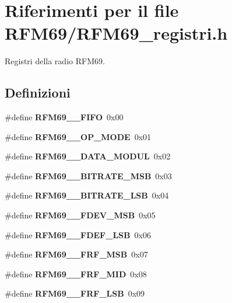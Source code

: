 \section{Riferimenti per il file R\+F\+M69/\+R\+F\+M69\+\_\+registri.h}
\label{_r_f_m69__registri_8h}


Registri della radio R\+F\+M69.  


\subsection*{Definizioni}
\begin{DoxyCompactItemize}
\item 
\mbox{\label{_r_f_m69__registri_8h_a0d65a2190c0877f705ef6b3f6bb2d181}} 
\#define {\bfseries R\+F\+M69\+\_\+\_\+\+F\+I\+FO}~0x00
\item 
\mbox{\label{_r_f_m69__registri_8h_a7026c0eeb6c9ff4a3c836b9c2510e92d}} 
\#define {\bfseries R\+F\+M69\+\_\+\_\+\+O\+P\+\_\+\+M\+O\+DE}~0x01
\item 
\mbox{\label{_r_f_m69__registri_8h_ac3e0614cefd0de36fab33cf18fd6178a}} 
\#define {\bfseries R\+F\+M69\+\_\+\_\+\+D\+A\+T\+A\+\_\+\+M\+O\+D\+UL}~0x02
\item 
\mbox{\label{_r_f_m69__registri_8h_aee33de14b2c7923a72fa3fb94675d502}} 
\#define {\bfseries R\+F\+M69\+\_\+\_\+\+B\+I\+T\+R\+A\+T\+E\+\_\+\+M\+SB}~0x03
\item 
\mbox{\label{_r_f_m69__registri_8h_a9a6fb1af1b6dbb92986013cd5fc61667}} 
\#define {\bfseries R\+F\+M69\+\_\+\_\+\+B\+I\+T\+R\+A\+T\+E\+\_\+\+L\+SB}~0x04
\item 
\mbox{\label{_r_f_m69__registri_8h_ad77df18feac22de48ea0d31db04b5f51}} 
\#define {\bfseries R\+F\+M69\+\_\+\_\+\+F\+D\+E\+V\+\_\+\+M\+SB}~0x05
\item 
\mbox{\label{_r_f_m69__registri_8h_a3fb6b789781742b9d2e2c54f52cf39a3}} 
\#define {\bfseries R\+F\+M69\+\_\+\_\+\+F\+D\+E\+F\+\_\+\+L\+SB}~0x06
\item 
\mbox{\label{_r_f_m69__registri_8h_a49246229de4a1430a500dc4acd071760}} 
\#define {\bfseries R\+F\+M69\+\_\+\_\+\+F\+R\+F\+\_\+\+M\+SB}~0x07
\item 
\mbox{\label{_r_f_m69__registri_8h_ab1ac01a794ac98b0d681bfd4162e50ee}} 
\#define {\bfseries R\+F\+M69\+\_\+\_\+\+F\+R\+F\+\_\+\+M\+ID}~0x08
\item 
\mbox{\label{_r_f_m69__registri_8h_a10c708dd05d4ee0f000bdf6415c7e31a}} 
\#define {\bfseries R\+F\+M69\+\_\+\_\+\+F\+R\+F\+\_\+\+L\+SB}~0x09

\end{DoxyCompactItemize}
